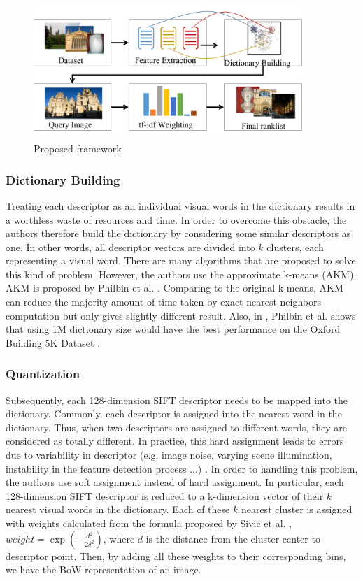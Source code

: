 \begin{figure}
    \centering
    \includegraphics[width=4.0in]{process_fixed.pdf}
    \caption{Proposed framework}
    \label{fig:proposed_framework}
\end{figure}

\subsubsection{Dictionary Building} \label{section:dictionary_building}
Treating each descriptor as an individual visual words in the dictionary results in a worthless waste of resources and time. In order to overcome this obstacle, the authors therefore build the dictionary by considering some similar descriptors as one. In other words, all descriptor vectors are divided into $k$ clusters, each representing a visual word. There are many algorithms that are proposed to solve this kind of problem. However, the authors use the approximate k-means (AKM). AKM is proposed by Philbin et al. \cite{2}. Comparing to the original k-means, AKM can reduce the majority amount of time taken by exact nearest neighbors computation but only gives slightly different result. Also, in \cite{2}, Philbin et al. shows that using 1M dictionary size would have the best performance on the Oxford Building 5K Dataset \cite{oxbuilding}.

\subsubsection{Quantization} \label{section:quantization}

Subsequently, each 128-dimension SIFT descriptor needs to be mapped into the dictionary. Commonly, each descriptor is assigned into the nearest word in the dictionary. Thus, when two descriptors are assigned to different words, they are considered as totally different. In practice, this hard assignment leads to errors due to variability in descriptor (e.g. image noise, varying scene illumination, instability in the feature detection process ...) \cite{7}. In order to handling this problem, the authors use soft assignment instead of hard assignment. In particular, each 128-dimension SIFT descriptor is reduced to a k-dimension vector of their $k$ nearest visual words in the dictionary. Each of these $k$ nearest cluster is assigned with weights calculated from the formula proposed by Sivic et al. \cite{7}, $weight = \exp(-\frac{d^2}{2\delta^2})$, where $d$ is the distance from the cluster center to descriptor point. Then, by adding all these weights to their corresponding bins, we have the BoW representation of an image.


